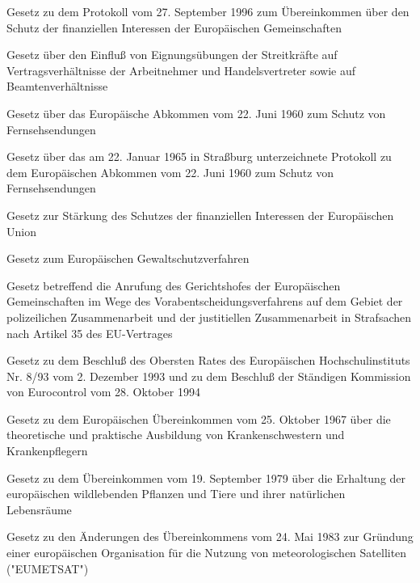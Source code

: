 \item[{EUBestG}] Gesetz zu dem Protokoll vom 27. September 1996 zum Übereinkommen über den Schutz der finanziellen Interessen der Europäischen Gemeinschaften

\item[{EÜG}] Gesetz über den Einfluß von Eignungsübungen der Streitkräfte auf Vertragsverhältnisse der Arbeitnehmer und Handelsvertreter sowie auf Beamtenverhältnisse

\item[{EuFernsAbkG}] Gesetz über das Europäische Abkommen vom 22. Juni 1960 zum Schutz von Fernsehsendungen

\item[{EuFernsAbkProtG}] Gesetz über das am 22. Januar 1965 in Straßburg unterzeichnete Protokoll zu dem Europäischen Abkommen vom 22. Juni 1960 zum Schutz von Fernsehsendungen

\item[{EUFinSchStG}] Gesetz zur Stärkung des Schutzes der finanziellen Interessen der Europäischen Union

\item[{EUGewSchVG}] Gesetz zum Europäischen Gewaltschutzverfahren

\item[{EuGHG}] Gesetz betreffend die Anrufung des Gerichtshofes der Europäischen Gemeinschaften im Wege des Vorabentscheidungsverfahrens auf dem Gebiet der polizeilichen Zusammenarbeit und der justitiellen Zusammenarbeit in Strafsachen nach Artikel 35 des EU-Vertrages

\item[{EuHSchul-EUROCONTROLBeschlG}] Gesetz zu dem Beschluß des Obersten Rates des Europäischen Hochschulinstituts Nr. 8/93 vom 2. Dezember 1993 und zu dem Beschluß der Ständigen Kommission von Eurocontrol vom 28. Oktober 1994

\item[{EuKrSchwAusbÜbkG}] Gesetz zu dem Europäischen Übereinkommen vom 25. Oktober 1967 über die theoretische und praktische Ausbildung von Krankenschwestern und Krankenpflegern

\item[{EuLRaumÜbkG}] Gesetz zu dem Übereinkommen vom 19. September 1979 über die Erhaltung der europäischen wildlebenden Pflanzen und Tiere und ihrer natürlichen Lebensräume

\item[{EUMETSATÜbkÄndG}] Gesetz zu den Änderungen des Übereinkommens vom 24. Mai 1983 zur Gründung einer europäischen Organisation für die Nutzung von meteorologischen Satelliten ("EUMETSAT")

